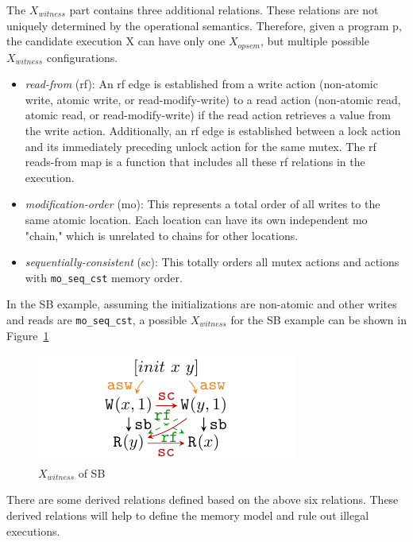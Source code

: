 The $X_{witness}$ part contains three additional relations. These relations are not uniquely determined by the operational semantics. Therefore, given a program p, the candidate execution X can have only one $X_{opsem}$, but multiple possible $X_{witness}$ configurations.



\begin{itemize}
	\item \textit{read-from} (rf): An rf edge is established from a write action (non-atomic write, atomic write, or read-modify-write) to a read action (non-atomic read, atomic read, or read-modify-write) if the read action retrieves a value from the write action. Additionally, an rf edge is established between a lock action and its immediately preceding unlock action for the same mutex. The rf reads-from map is a function that includes all these rf relations in the execution.
	\item \textit{modification-order} (mo): This represents a total order of all writes to the same atomic location. Each location can have its own independent mo "chain," which is unrelated to chains for other locations.
	\item \textit{sequentially-consistent} (sc): This totally orders all mutex actions and actions with \texttt{mo\_seq\_cst} memory order.
\end{itemize}


In the SB example, assuming the initializations are non-atomic and other writes and reads are \texttt{mo\_seq\_cst}, a possible $X_{witness}$ for the SB example can be shown in Figure~\ref{XwitnessSB}


\begin{figure}[htbp] %
	\centering
	\includegraphics[scale=1.3]{figure/exec-graph/SB2.pdf} %
	\caption{$X_{witness}$ of SB} %
	\label{XwitnessSB} %
\end{figure}

There are some derived relations defined based on the above six relations. These derived relations will help to define the memory model and rule out illegal executions.

